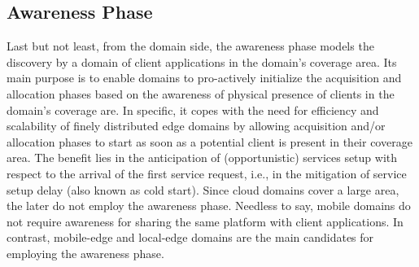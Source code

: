 



\subsection{Awareness Phase}\label{sec:A3-E-awareness}




Last but not least, from the domain side, the awareness phase models the discovery by a domain of client applications in the domain's coverage area. Its main purpose is to enable domains to pro-actively initialize the acquisition and allocation phases based on the awareness of physical presence of clients in the domain's coverage are. In specific, it copes with the need for efficiency and scalability of finely distributed edge domains by allowing acquisition and/or allocation phases to start as soon as a potential client is present in their coverage area. The benefit lies in the anticipation of (opportunistic) services setup with respect to the arrival of the first service request, i.e., in the mitigation of service setup delay (also known as cold start). Since cloud domains cover a large area, the later do not employ the awareness phase. Needless to say, mobile domains do not require awareness for sharing the same platform with client applications. In contrast, mobile-edge and local-edge domains are the main candidates for employing the awareness phase. 

